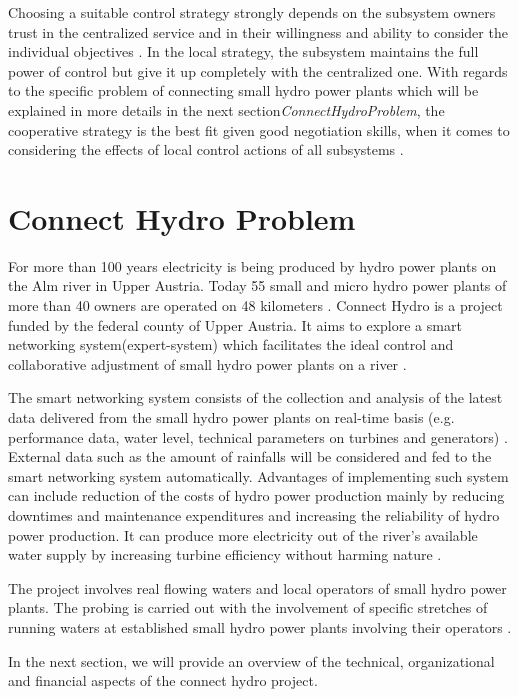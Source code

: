 Choosing a suitable control strategy strongly depends on the subsystem owners trust in the centralized service and in their willingness and ability to consider the individual objectives \cite{SEIT2017}. In the local strategy, the subsystem maintains the full power of control but give it up completely with the centralized one. With regards to the specific problem of connecting small hydro power plants which will be explained in more details in the next section\textit{ConnectHydroProblem}, the cooperative strategy is the best fit given good negotiation skills, when it comes to considering the effects of local control actions of all subsystems \cite{SEIT2017}.
\section{Connect Hydro Problem}
\label{ConnectHydroProblem}
For more than 100 years electricity is being produced by hydro power plants on the Alm river in Upper Austria. Today 55 small and micro hydro power plants of more than 40 owners are operated on 48 kilometers \cite{SEIT2017}. Connect Hydro is a project funded by the federal county of Upper Austria. It aims to explore a smart networking system(expert-system) which facilitates the ideal control and collaborative adjustment of small hydro power plants on a river \cite{SEIT2017}.

The smart networking system consists of the collection and analysis of the latest data delivered from the small hydro power plants on real-time basis (e.g. performance data, water level, technical parameters on turbines and generators) \cite{SEIT2017}. External data such as the amount of rainfalls will be considered and fed to the smart networking system automatically. Advantages of implementing such system can include reduction of the costs of hydro power production mainly by reducing downtimes and maintenance expenditures and increasing the reliability of hydro power production. It can produce more electricity out of the river's available water supply by increasing turbine efficiency without harming nature \cite{SEIT2017}.

The project involves real flowing waters and local operators of small hydro power plants. The probing is carried out with the involvement of specific stretches of running waters at established small hydro power plants involving their operators \cite{SEIT2017}. 

In the next section, we will provide an overview of the technical, organizational and financial aspects of the connect hydro project. 
